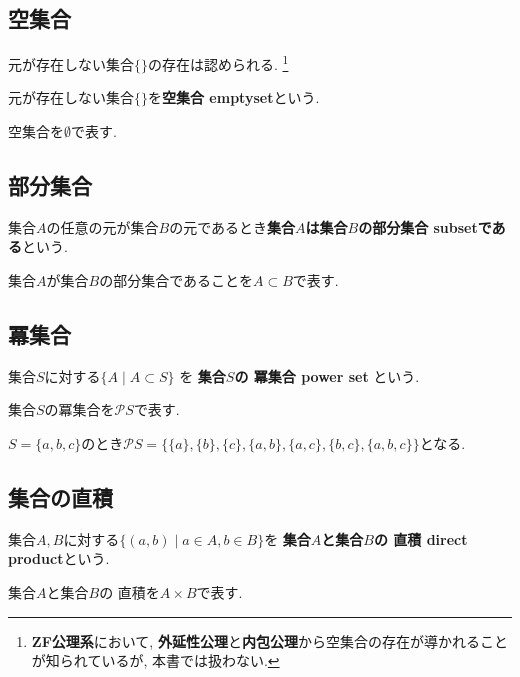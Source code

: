 \subsection{空集合}
元が存在しない集合$\{\}$の存在は認められる.
\footnote{{\bf ZF公理系}において, {\bf 外延性公理}と{\bf 内包公理}から空集合の存在が導かれることが知られているが, 本書では扱わない.}
\begin{Def}
元が存在しない集合$\{\}$を{\bf 空集合 emptyset}という.
\end{Def}
\begin{Notation}
空集合を$\emptyset$で表す.
\end{Notation}
\subsection{部分集合}
\begin{Def}
集合$A$の任意の元が集合$B$の元であるとき{\bf 集合$A$は集合$B$の部分集合 subsetである}という.  
\end{Def}
\begin{Notation}
集合$A$が集合$B$の部分集合であることを$A\subset B$で表す.
\end{Notation}
\subsection{冪集合}
\begin{Def}
集合$S$に対する$\{A\mid A\subset S\}$
を
{\bf 集合$S$の
冪集合 power set}
という.
\end{Def}
\begin{Notation}
集合$S$の冪集合を$\mathcal{P}S$で表す.
\end{Notation}
\begin{example}
$S=\{a,b,c\}$のとき$\mathcal{P} S=\{\{a\},\{b\},\{c\},\{a,b\},\{a,c\},\{b,c\},\{a,b,c\}\}$となる.
\end{example}

\subsection{集合の直積}
\begin{Def}
集合$A,B$に対する$\{(a,b)\mid a\in A, b\in B\}$を
{\bf 集合$A$と集合$B$の
直積 direct product}という.
\end{Def}
\begin{Notation}
集合$A$と集合$B$の
直積を$A\times B$で表す.
\end{Notation}
\begin{comment}
実は, 集合を「ものの集まり」と素朴に定義することは, 矛盾を孕んでいる. この矛盾を避けるための議論はのちに行う. 
\end{comment}
